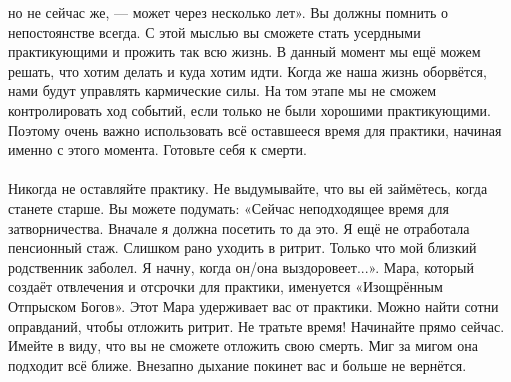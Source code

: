       но не сейчас же, — может через несколько лет».
      Вы должны помнить о непостоянстве всегда.
      С этой мыслью вы сможете стать усердными практикующими и прожить так всю жизнь.
      В данный момент мы ещё можем решать, что хотим делать и куда хотим идти.
      Когда же наша жизнь оборвётся, нами будут управлять кармические силы.
      На том этапе мы не сможем контролировать ход событий,
      если только не были хорошими практикующими.
      Поэтому очень важно использовать всё оставшееся время для практики,
      начиная именно с этого момента. Готовьте себя к смерти.
\\ \\ Никогда не оставляйте практику. Не выдумывайте, что вы ей займётесь, когда станете старше. Вы можете подумать: «Сейчас неподходящее время для затворничества. Вначале я должна посетить то да это. Я ещё не отработала пенсионный стаж. Слишком рано уходить в ритрит. Только что мой близкий родственник заболел. Я начну, когда он/она выздоровеет...». Мара, который создаёт отвлечения и отсрочки для практики, именуется «Изощрённым Отпрыском Богов». Этот Мара удерживает вас от практики. Можно найти сотни оправданий, чтобы отложить ритрит. Не тратьте время! Начинайте прямо сейчас. Имейте в виду, что вы не сможете отложить свою смерть. Миг за мигом она подходит всё ближе. Внезапно дыхание покинет вас и больше не вернётся.
